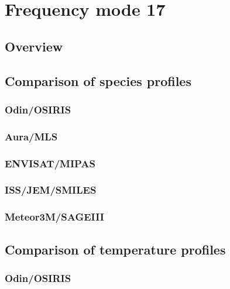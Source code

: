 \section{Frequency mode 17}
\label{sec:fm17}

\subsection{Overview}
\label{sec:fm17:overview}

\subsection{Comparison of species profiles}
\label{sec:fm17:comparison:species}

\subsubsection{Odin/OSIRIS}
\label{sec:fm17:comparison:species:osiris}

\subsubsection{Aura/MLS}
\label{sec:fm17:comparison:species:mls}

\subsubsection{ENVISAT/MIPAS}
\label{sec:fm17:comparison:species:mipas}

\subsubsection{ISS/JEM/SMILES}
\label{sec:fm17:comparison:species:smiles}

\subsubsection{Meteor3M/SAGEIII}
\label{sec:fm17:comparison:species:sage3}


\subsection{Comparison of temperature profiles}
\label{sec:fm17:comparison:temperature}

\subsubsection{Odin/OSIRIS}
\label{sec:fm17:comparison:temperature:osiris}


